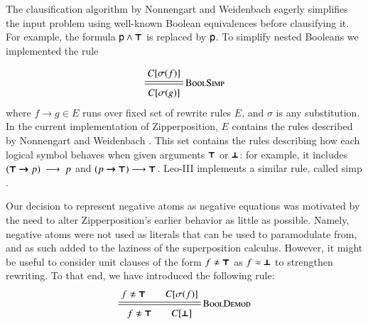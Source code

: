 The clausification algorithm by Nonnengart and Weidenbach \cite{nw-01-small-cnf}
eagerly simplifies the input problem using well-known Boolean equivalences before clausifying it. For example,
the formula $\mathsf{p}\land\pmb{\top}$ is replaced by $\mathsf{p}$. To simplify nested Booleans we implemented the rule

\[
\namedsimp{BoolSimp}{C[\sigmaterm{f}]}{C[\sigmaterm{g}]}
\]
where $f \longrightarrow g \in E$ runs over fixed set of rewrite rules $E$,
and $\sigma$ is any substitution. In the current implementation of Zipperposition, $E$ contains the rules
described by Nonnengart and Weidenbach \cite[Sect.~3]{nw-01-small-cnf}. This set contains
the rules describing how each logical symbol behaves when given arguments $\pmb{\top}$ or $\pmb{\bot}$: for example, 
it includes $(\pmb{\top} \pmb{\rightarrow} p)~\longrightarrow~p $ and $(p \pmb{\rightarrow} \pmb{\top}) \longrightarrow \pmb{\top}$. %
Leo-III implements a similar rule, called \textsf{simp} \cite[Sect.~4.2.1.]{as-18-phd}.


Our decision to represent negative atoms as negative equations was motivated by
the need to alter Zipperposition's earlier behavior as little as possible. 
Namely, negative atoms were not used as literals that can be used
to paramodulate from, and as such added to the laziness of the superposition calculus.
However, it might be useful to consider unit clauses of the form $f \noteq \itrue$
as $f \approx \pmb{\bot}$ to strengthen rewriting. To that end, we have introduced the following
rule:
%
$$ \namedsimp{BoolDemod}{f \noteq \itrue \qquad C[\sigmaterm{f}]}{f \noteq \itrue \qquad C[\ifalse]} $$

